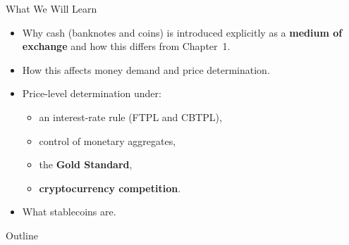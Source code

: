 \documentclass[11pt,aspectratio=169]{beamer}
\begin{document}
\begin{frame}{What We Will Learn}
\small
\begin{itemize}

    \item Why cash (banknotes and coins) is introduced explicitly as a \textbf{medium of exchange} and how this differs from Chapter~1.

    \vspace{0.6em}

    \item How this affects money demand and price determination.

    \vspace{0.6em}


    \item Price-level determination under:
    \begin{itemize}
        \item an interest-rate rule (FTPL and CBTPL),
        \item control of monetary aggregates,
        \item the \textbf{Gold Standard},
        \item \textbf{cryptocurrency competition}.
    \end{itemize}

    \vspace{0.6em}

    \item What stablecoins are.

\end{itemize}
\end{frame}


\begin{frame}{Outline}
\tableofcontents
\end{frame}

\setcounter{equation}{0}
\renewcommand{\theequation}{2.\arabic{equation}}


\end{document}
